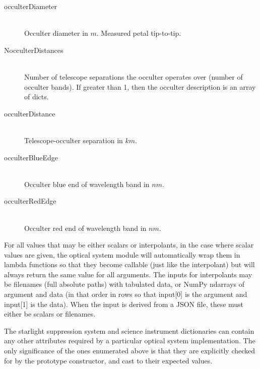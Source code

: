 \documentclass[cleanfoot]{asme2ej}
\begin{document}
\begin{itemize}
\begin{description}
\begin{description}
    \item[occulterDiameter]\hfill \\
    Occulter diameter in $ m $.  Measured petal tip-to-tip.
    \item [NocculterDistances]\hfill \\
    Number of telescope separations the occulter operates over (number of occulter bands). If greater than 1, then the occulter description is an array of dicts.
    \item[occulterDistance]\hfill \\
    Telescope-occulter separation in $km$.
    \item[occulterBlueEdge]\hfill \\
    Occulter blue end of wavelength band in $nm$.
    \item[occulterRedEdge]\hfill \\
    Occulter red end of wavelength band in $nm$.
    \end{description}
\end{description}
\end{itemize}
For all values that may be either scalars or interpolants, in the case where scalar values are given, the optical system module will automatically wrap them in lambda functions so that they become callable (just like the interpolant) but will always return the same value for all arguments.  The inputs for interpolants may be filenames (full absolute paths) with tabulated data, or NumPy ndarrays of argument and data (in that order in rows so that input[0] is the argument and input[1] is the data).  When the input is derived from a JSON file, these must either be scalars or filenames.

The starlight suppression system and science instrument dictionaries can contain any other attributes required by a particular optical system implementation.  The only significance of the ones enumerated above is that they are explicitly checked for by the prototype constructor, and cast to their expected values.

\end{document}

